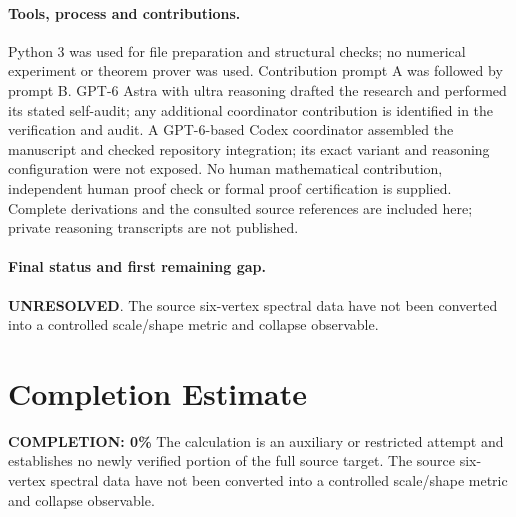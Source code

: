\documentclass[11pt]{article}
\begin{document}
\paragraph{Tools, process and contributions.}
Python 3 was used for file preparation and structural checks; no numerical experiment or theorem prover was used. Contribution prompt A was followed by prompt B. GPT-6 Astra with ultra reasoning drafted the research and performed its stated self-audit; any additional coordinator contribution is identified in the verification and audit. A GPT-6-based Codex coordinator assembled the manuscript and checked repository integration; its exact variant and reasoning configuration were not exposed. No human mathematical contribution, independent human proof check or formal proof certification is supplied. Complete derivations and the consulted source references are included here; private reasoning transcripts are not published.

\paragraph{Final status and first remaining gap.}
\textbf{UNRESOLVED}. The source six-vertex spectral data have not been converted into a controlled scale/shape metric and collapse observable.

\section{Completion Estimate}
\noindent\textbf{COMPLETION: 0\%}
The calculation is an auxiliary or restricted attempt and establishes no newly verified portion of the full source target. The source six-vertex spectral data have not been converted into a controlled scale/shape metric and collapse observable.
\end{document}
